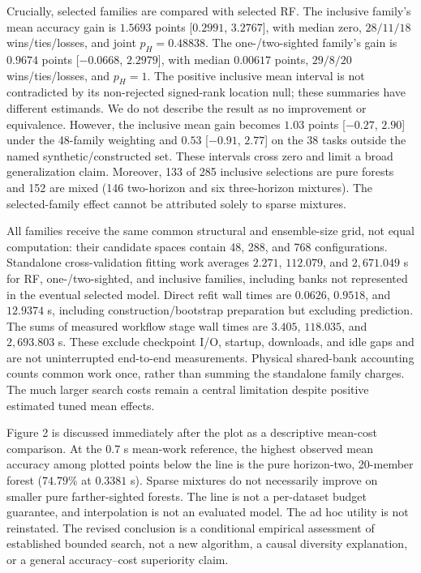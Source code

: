 Crucially, selected families are compared with selected RF. The inclusive
family's mean accuracy gain is $1.5693$ points [$0.2991$, $3.2767$],
with median zero, $28/11/18$ wins/ties/losses, and joint $p_H=0.48838$.
The one-/two-sighted family's gain is $0.9674$ points [$-0.0668$, $2.2979$],
with median $0.00617$ points, $29/8/20$ wins/ties/losses, and $p_H=1$.
The positive inclusive mean interval is not contradicted by its non-rejected
signed-rank location null; these summaries have different estimands. We do
not describe the result as no improvement or equivalence. However, the
inclusive mean gain becomes $1.03$ points [$-0.27$, $2.90$] under the
48-family weighting and $0.53$ [$-0.91$, $2.77$] on the 38 tasks outside
the named synthetic/constructed set. These intervals cross zero and limit a broad
generalization claim. Moreover, 133 of 285 inclusive selections are pure
forests and 152 are mixed (146 two-horizon and six three-horizon mixtures).
The selected-family effect cannot be attributed solely to sparse mixtures.

All families receive the same common structural and ensemble-size grid,
not equal computation: their candidate spaces contain 48, 288, and 768
configurations. Standalone cross-validation fitting work averages $2.271$,
$112.079$, and $2,671.049$ s for RF, one-/two-sighted, and inclusive
families, including banks not represented in the eventual selected model.
Direct refit wall times are $0.0626$, $0.9518$, and $12.9374$ s, including
construction/bootstrap preparation but excluding prediction. The sums of
measured workflow stage wall times are $3.405$, $118.035$, and $2,693.803$
s. These exclude checkpoint I/O, startup, downloads, and idle gaps and are
not uninterrupted end-to-end measurements. Physical shared-bank accounting
counts common work once, rather than summing the standalone family charges.
The much larger search costs remain a central limitation despite positive
estimated tuned mean effects.

Figure 2 is discussed immediately after the plot as a descriptive mean-cost
comparison. At the $0.7$ s mean-work reference, the highest observed mean
accuracy among plotted points below the line is the pure horizon-two,
20-member forest ($74.79\%$ at $0.3381$ s). Sparse mixtures do not
necessarily improve on smaller pure farther-sighted forests. The line is
not a per-dataset budget guarantee, and interpolation is not an evaluated
model. The ad hoc utility is not reinstated. The revised conclusion is a
conditional empirical assessment of established bounded search, not a new
algorithm, a causal diversity explanation, or a general accuracy--cost
superiority claim.

